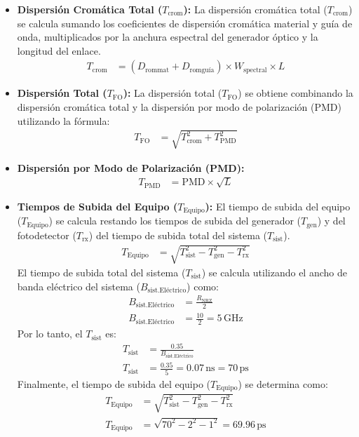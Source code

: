 \begin{itemize}
\begin{itemize}
	\item \textbf{Dispersión Cromática Total (\(T_{\text{crom}}\)):} La dispersión cromática total (\(T_{\text{crom}}\)) se calcula sumando los coeficientes de dispersión cromática material y guía de onda, multiplicados por la anchura espectral del generador óptico y la longitud del enlace.
	\begin{align}
	T_{\text{crom}} &= (D_{\text{rommat}} + D_{\text{romguía}}) \times W_{\text{spectral}} \times L
	\end{align}
	\item \textbf{Dispersión Total (\(T_{\text{FO}}\)):} La dispersión total (\(T_{\text{FO}}\)) se obtiene combinando la dispersión cromática total y la dispersión por modo de polarización (PMD) utilizando la fórmula:
	\begin{align}
	T_{\text{FO}} &= \sqrt{T_{\text{crom}}^2 + T_{\text{PMD}}^2}
	\end{align}
	\item \textbf{Dispersión por Modo de Polarización (PMD):} 
	\begin{align}
	T_{\text{PMD}} &= \text{PMD} \times \sqrt{L}
	\end{align}
	\item \textbf{Tiempos de Subida del Equipo (\(T_{\text{Equipo}}\)):} 
	El tiempo de subida del equipo (\(T_{\text{Equipo}}\)) se calcula restando los tiempos de subida del generador (\(T_{\text{gen}}\)) y del fotodetector (\(T_{\text{rx}}\)) del tiempo de subida total del sistema (\(T_{\text{sist}}\)).
	\begin{align}
	T_{\text{Equipo}} &= \sqrt{T_{\text{sist}}^2 - T_{\text{gen}}^2 - T_{\text{rx}}^2}
	\end{align}
	El tiempo de subida total del sistema (\(T_{\text{sist}}\)) se calcula utilizando el ancho de banda eléctrico del sistema (\(B_{\text{sist.Eléctrico}}\)) como:
	\begin{align}
	B_{\text{sist.Eléctrico}} &= \frac{R_{\text{NRZ}}}{2} \\
	B_{\text{sist.Eléctrico}} &= \frac{10}{2} = 5 \, \text{GHz}
	\end{align}
	Por lo tanto, el \(T_{\text{sist}}\) es:
	\begin{align}
	T_{\text{sist}} &= \frac{0.35}{B_{\text{sist.Eléctrico}}} \\
	T_{\text{sist}} &= \frac{0.35}{5} = 0.07 \, \text{ns} = 70 \, \text{ps}
	\end{align}
	Finalmente, el tiempo de subida del equipo (\(T_{\text{Equipo}}\)) se determina como:
	\begin{align}
	T_{\text{Equipo}} &= \sqrt{T_{\text{sist}}^2 - T_{\text{gen}}^2 - T_{\text{rx}}^2} \\
	T_{\text{Equipo}} &= \sqrt{70^2 - 2^2 - 1^2} = 69.96 \, \text{ps}
	\end{align}
\end{itemize}


\end{itemize}
